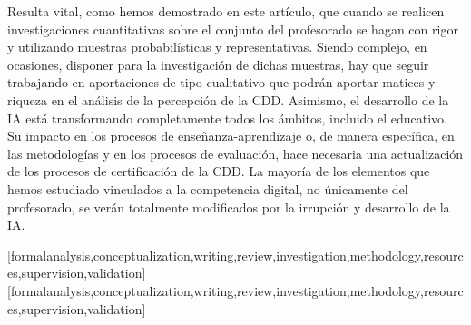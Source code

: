 \documentclass[spanish]{textolivre}
\begin{document}
Resulta vital, como hemos demostrado en este artículo, que cuando se realicen investigaciones cuantitativas sobre el conjunto del profesorado se hagan con rigor y utilizando muestras probabilísticas y representativas. Siendo complejo, en ocasiones, disponer para la investigación de dichas muestras, hay que seguir trabajando en aportaciones de tipo cualitativo que podrán aportar matices y riqueza en el análisis de la percepción de la CDD. Asimismo, el desarrollo de la IA está transformando completamente todos los ámbitos, incluido el educativo. Su impacto en los procesos de enseñanza-aprendizaje o, de manera específica, en las metodologías y en los procesos de evaluación, hace necesaria una actualización de los procesos de certificación de la CDD. La mayoría de los elementos que hemos estudiado vinculados a la competencia digital, no únicamente del profesorado, se verán totalmente modificados por la irrupción y desarrollo de la IA. 


\printbibliography\label{sec-bib}


\begin{contributors}
[formalanalysis,conceptualization,writing,review,investigation,methodology,resources,supervision,validation]
[formalanalysis,conceptualization,writing,review,investigation,methodology,resources,supervision,validation]
\end{contributors}
\end{document}

